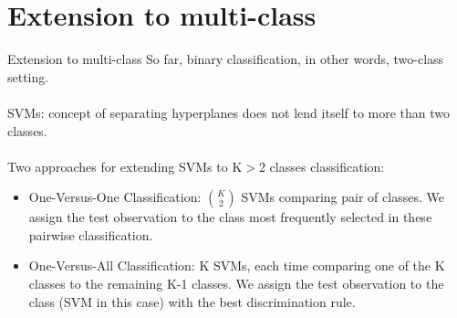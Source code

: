 \documentclass[notes]{beamer}          %
\begin{document}
\section{Extension to multi-class}
\begin{frame}{Extension to multi-class}
So far, binary classification, in other words, two-class setting. \\~\\
SVMs: concept of separating hyperplanes does not lend itself to more than two classes. \\~\\
Two approaches for extending SVMs to K$>$2 classes classification:
\begin{itemize}
 \item One-Versus-One Classification: $\binom{K}{2}$ SVMs comparing pair of classes. We assign the test observation to the class most frequently selected in these pairwise classification.
 \item One-Versus-All Classification: K SVMs, each time comparing one of the K classes to the remaining K-1 classes. We assign the test observation to the class (SVM in this case) with the best discrimination rule. 
\end{itemize}


\end{frame}
\end{document}
